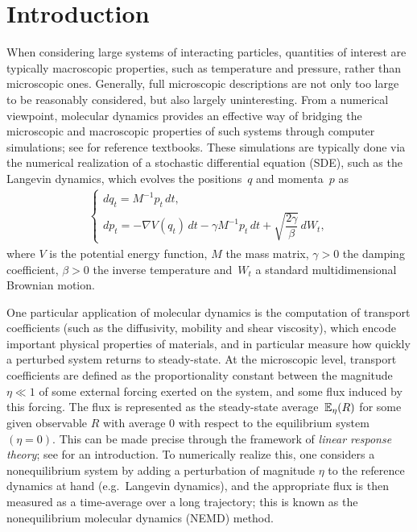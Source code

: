 \section{Introduction}
\label{sec:introduction}
%
When considering large systems of interacting particles, quantities of interest are typically macroscopic properties, such as temperature and pressure, rather than microscopic ones. Generally, full microscopic descriptions are not only too large to be reasonably considered, but also largely uninteresting. From a numerical viewpoint, molecular dynamics provides an effective way of bridging the microscopic and macroscopic properties of such systems through computer simulations; see \cite{tuckerman2010, leimkuhler2015,allen2017} for reference textbooks. These simulations are typically done via the numerical realization of a stochastic differential equation (SDE), such as the Langevin dynamics, which evolves the positions~$q$ and momenta~$p$ as
%
\begin{equation}
\begin{aligned}
\begin{cases}
    dq_t = M^{-1} p_t \, dt, \\
    dp_t = -\nabla V(q_t) \, dt - \gamma M^{-1} p_t \, dt + \sqrt{\dfrac{2\gamma}{\beta}} \, dW_t,
    \label{eq:lang_dynamics}
\end{cases}
\end{aligned}
\end{equation}
%
where $V$ is the potential energy function, $M$ the mass matrix, $\gamma>0$ the damping coefficient, $\beta>0$ the inverse temperature and~$W_t$ a standard multidimensional Brownian motion.

One particular application of molecular dynamics is the computation of transport coefficients (such as the diffusivity, mobility and shear viscosity), which encode important physical properties of materials, and in particular measure how quickly a perturbed system returns to steady-state. At the microscopic level, transport coefficients are defined as the proportionality constant between the magnitude $\eta\ll 1$ of some external forcing exerted on the system, and some flux induced by this forcing. The flux is represented as the steady-state average~$\mathbb{E}_\eta(R)$ for some given observable $R$ with average 0 with respect to the equilibrium system $(\eta=0)$. This can be made precise through the framework of \emph{linear response theory}; see \cite[Chapter 8]{chandler1987} for an introduction. To numerically realize this, one considers a nonequilibrium system by adding a perturbation of magnitude $\eta$ to the reference dynamics at hand (e.g.\ Langevin dynamics), and the appropriate flux is then measured as a time-average over a long trajectory; this is known as the nonequilibrium molecular dynamics (NEMD) method.

